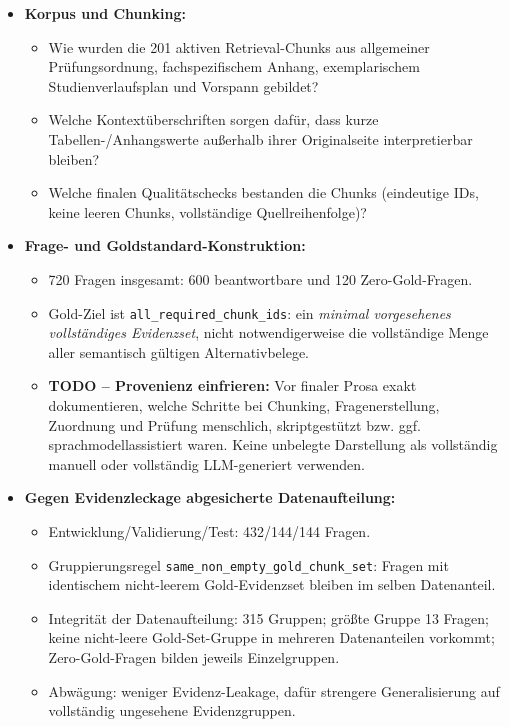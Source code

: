 \documentclass[11pt]{article}
\begin{document}
\begin{leitfragenbox}
\begin{itemize}
    \item \textbf{Korpus und Chunking:}
    \begin{itemize}
        \item Wie wurden die 201 aktiven Retrieval-Chunks aus allgemeiner Prüfungsordnung, fachspezifischem Anhang, exemplarischem Studienverlaufsplan und Vorspann gebildet?
        \item Welche Kontextüberschriften sorgen daf\"ur, dass kurze Tabellen-/Anhangswerte au\ss erhalb ihrer Originalseite interpretierbar bleiben?
        \item Welche finalen Qualit\"atschecks bestanden die Chunks (eindeutige IDs, keine leeren Chunks, vollst\"andige Quellreihenfolge)?
    \end{itemize}
    \item \textbf{Frage- und Goldstandard-Konstruktion:}
    \begin{itemize}
        \item 720 Fragen insgesamt: 600 beantwortbare und 120 Zero-Gold-Fragen.
        \item Gold-Ziel ist \texttt{all\_required\_chunk\_ids}: ein \textit{minimal vorgesehenes vollständiges Evidenzset}, nicht notwendigerweise die vollständige Menge aller semantisch gültigen Alternativbelege.
        \item \textbf{TODO -- Provenienz einfrieren:} Vor finaler Prosa exakt dokumentieren, welche Schritte bei Chunking, Fragenerstellung, Zuordnung und Pr\"ufung menschlich, skriptgest\"utzt bzw. ggf. sprachmodellassistiert waren. Keine unbelegte Darstellung als vollständig manuell oder vollständig LLM-generiert verwenden.
    \end{itemize}
    \item \textbf{Gegen Evidenzleckage abgesicherte Datenaufteilung:}
    \begin{itemize}
        \item Entwicklung/Validierung/Test: 432/144/144 Fragen.
        \item Gruppierungsregel \texttt{same\_non\_empty\_gold\_chunk\_set}: Fragen mit identischem nicht-leerem Gold-Evidenzset bleiben im selben Datenanteil.
        \item Integrität der Datenaufteilung: 315 Gruppen; gr\"o\ss te Gruppe 13 Fragen; keine nicht-leere Gold-Set-Gruppe in mehreren Datenanteilen vorkommt; Zero-Gold-Fragen bilden jeweils Einzelgruppen.
        \item Abwägung: weniger Evidenz-Leakage, dafür strengere Generalisierung auf vollständig ungesehene Evidenzgruppen.

\end{itemize}
\end{itemize}
\end{leitfragenbox}
\end{document}
